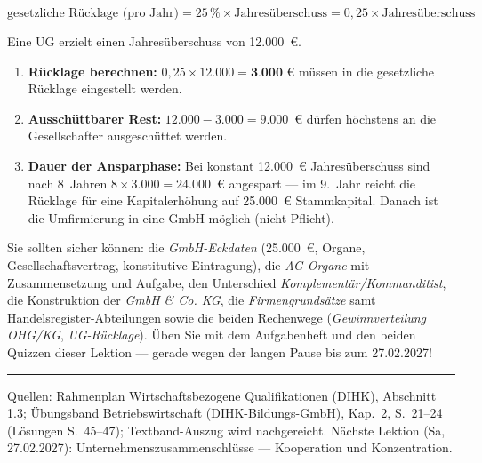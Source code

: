 \documentclass[11pt, a4paper]{article}
\begin{document}
\[
\textrm{gesetzliche Rücklage (pro Jahr)} = 25\,\% \times \textrm{Jahresüberschuss}
= 0{,}25 \times \textrm{Jahresüberschuss}
\]

\begin{beispiel}[title={\bfseries Zahlenbeispiel: UG-Rücklage}]
Eine UG erzielt einen Jahresüberschuss von 12.000~€.
\begin{enumerate}
  \item \textbf{Rücklage berechnen:} $0{,}25 \times 12.000 = \textbf{3.000~€}$
    müssen in die gesetzliche Rücklage eingestellt werden.
  \item \textbf{Ausschüttbarer Rest:} $12.000 - 3.000 = 9.000$~€ dürfen höchstens
    an die Gesellschafter ausgeschüttet werden.
  \item \textbf{Dauer der Ansparphase:} Bei konstant 12.000~€ Jahresüberschuss sind
    nach 8~Jahren $8 \times 3.000 = 24.000$~€ angespart --- im 9.~Jahr reicht die Rücklage
    für eine Kapitalerhöhung auf 25.000~€ Stammkapital. Danach ist die Umfirmierung in eine
    GmbH möglich (nicht Pflicht).
\end{enumerate}
\end{beispiel}

\begin{merksatz}[title={\bfseries Wichtig für die Prüfungsvorbereitung (Teil 2)}]
Sie sollten sicher können: die \emph{GmbH-Eckdaten} (25.000~€, Organe,
Gesellschaftsvertrag, konstitutive Eintragung), die \emph{AG-Organe} mit Zusammensetzung
und Aufgabe, den Unterschied \emph{Komplementär/Kommanditist}, die Konstruktion der
\emph{GmbH \& Co. KG}, die \emph{Firmengrundsätze} samt Handelsregister-Abteilungen
sowie die beiden Rechenwege (\emph{Gewinnverteilung OHG/KG}, \emph{UG-Rücklage}).
Üben Sie mit dem Aufgabenheft und den beiden Quizzen dieser Lektion ---
gerade wegen der langen Pause bis zum 27.02.2027!
\end{merksatz}

\vspace{1em}
\hrule
\vspace{0.8em}
\noindent\textsf{\small Quellen: Rahmenplan Wirtschaftsbezogene Qualifikationen (DIHK), Abschnitt 1.3;
Übungsband Betriebswirtschaft (DIHK-Bildungs-GmbH), Kap.~2, S.~21--24 (Lösungen S.~45--47);
Textband-Auszug wird nachgereicht. Nächste Lektion (Sa, 27.02.2027): Unternehmenszusammenschlüsse ---
Kooperation und Konzentration.}
\end{document}
